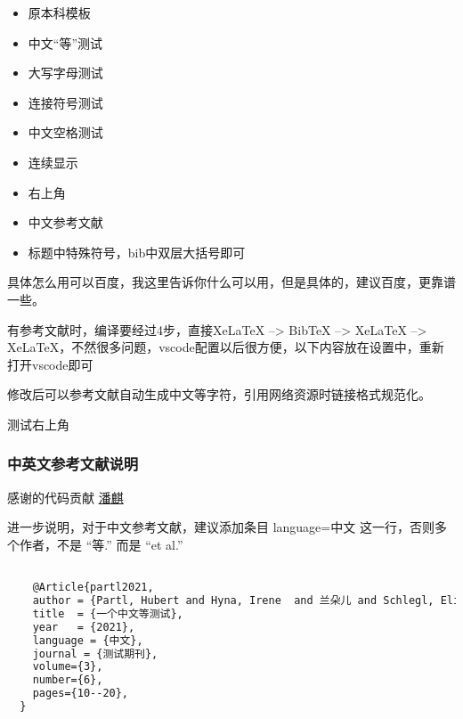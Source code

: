 \documentclass[AutoFakeBold]{LZUThesis}
\begin{document}
\begin{itemize}
    \item 原本科模板\cite{partl2016}
    \item 中文“等”测试\cite{partl2021}
    \item 大写字母测试\cite{partl2022-2}
    \item 连接符号测试\cite{partl2022-3}
    \item 中文空格测试\cite{partl2022}
    \item 连续显示\cite{partl2021,partl2022-2,partl2022-3}
    \item 右上角\cite{partl2016,partl2021,partl2022-2}
    \item 中文参考文献 \cite{李刚2006基于动态光谱的脉搏血氧测量精度分析}
    \item 标题中特殊符号，bib中双层大括号即可 \cite{PhysRevLett.108.024101}
\end{itemize}


具体怎么用可以百度，我这里告诉你什么可以用，但是具体的，建议百度，更靠谱一些。


有参考文献时，编译要经过4步，直接XeLaTeX --> BibTeX --> XeLaTeX --> XeLaTeX，不然很多问题，vscode配置以后很方便，以下内容放在设置中，重新打开vscode即可

修改后可以参考文献自动生成中文等字符\cite{partl2021}\cite{partl2022}\cite{partl2022-2}，引用网络资源时链接格式规范化\cite{intelnewsroomIntelUnveils12th2021,wilsonHistoryDevelopmentParallel1994}。

测试右上角 \cite{partl2021}

\subsubsection{中英文参考文献说明}

感谢的代码贡献
\href{https://gitee.com/versemonger}{潘麒}

进一步说明，对于中文参考文献，建议添加条目 language={中文} 这一行，否则多个作者，不是 “等.”\cite{partl2021} 而是 “et al.”\cite{partl2016}
\begin{lstlisting}[language = tex]

    @Article{partl2021,
    author = {Partl, Hubert and Hyna, Irene  and 兰朵儿 and Schlegl, Elisabeth},
    title  = {一个中文等测试},
    year   = {2021},
    language = {中文},
    journal = {测试期刊},
    volume={3},
    number={6},
    pages={10--20},
  }
  
\end{lstlisting}


\end{document}
